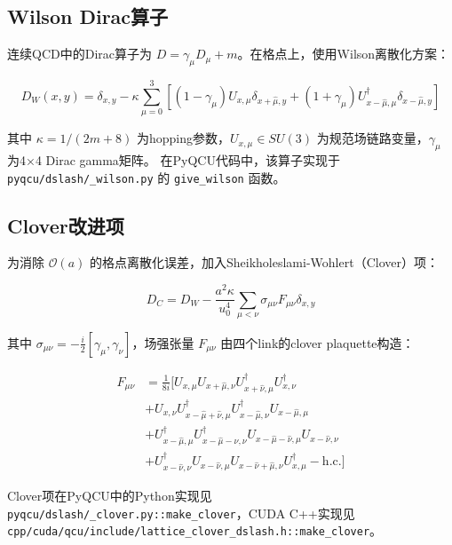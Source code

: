 \documentclass[11pt,a4paper]{article}
\begin{document}
\subsection{Wilson Dirac算子}

连续QCD中的Dirac算子为 $D = \gamma_\mu D_\mu + m$。在格点上，使用Wilson离散化方案：

\begin{equation}
D_W(x,y) = \delta_{x,y} - \kappa \sum_{\mu=0}^{3} \left[(1-\gamma_\mu)U_{x,\mu}\delta_{x+\hat{\mu},y} + (1+\gamma_\mu)U^\dagger_{x-\hat{\mu},\mu}\delta_{x-\hat{\mu},y}\right]
\end{equation}

其中 $\kappa = 1/(2m + 8)$ 为hopping参数，$U_{x,\mu} \in SU(3)$ 为规范场链路变量，$\gamma_\mu$ 为4×4 Dirac gamma矩阵。
在PyQCU代码中，该算子实现于 \texttt{pyqcu/dslash/\_wilson.py} 的 \texttt{give\_wilson} 函数。

\subsection{Clover改进项}

为消除 $\mathcal{O}(a)$ 的格点离散化误差，加入Sheikholeslami-Wohlert（Clover）项：

\begin{equation}
D_C = D_W - \frac{a^2\kappa}{u_0^4}\sum_{\mu<\nu}\sigma_{\mu\nu}F_{\mu\nu}\delta_{x,y}
\end{equation}

其中 $\sigma_{\mu\nu} = -\frac{i}{2}[\gamma_\mu,\gamma_\nu]$，场强张量 $F_{\mu\nu}$ 由四个link的clover plaquette构造：

\begin{align}
F_{\mu\nu} &= \frac{1}{8i}\Big[
    U_{x,\mu}U_{x+\hat{\mu},\nu}U^\dagger_{x+\hat{\nu},\mu}U^\dagger_{x,\nu} \\
    &+ U_{x,\nu}U^\dagger_{x-\hat{\mu}+\hat{\nu},\mu}U^\dagger_{x-\hat{\mu},\nu}U_{x-\hat{\mu},\mu} \\
    &+ U^\dagger_{x-\hat{\mu},\mu}U^\dagger_{x-\hat{\mu}-\hat{\nu},\nu}U_{x-\hat{\mu}-\hat{\nu},\mu}U_{x-\hat{\nu},\nu} \\
    &+ U^\dagger_{x-\hat{\nu},\nu}U_{x-\hat{\nu},\mu}U_{x-\hat{\nu}+\hat{\mu},\nu}U^\dagger_{x,\mu} - \text{h.c.}\Big]
\end{align}

Clover项在PyQCU中的Python实现见 \texttt{pyqcu/dslash/\_clover.py::make\_clover}，CUDA C++实现见
\texttt{cpp/cuda/qcu/include/lattice\_clover\_dslash.h::make\_clover}。
\end{document}
